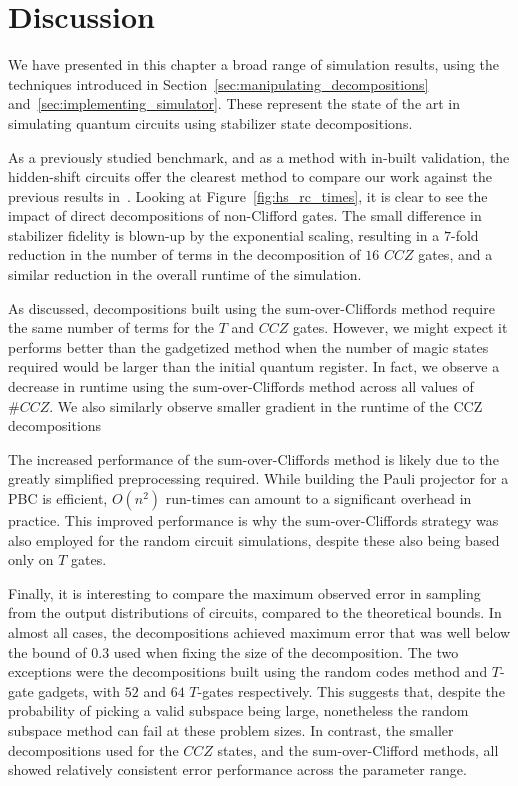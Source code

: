 \section{Discussion}
We have presented in this chapter a broad range of simulation results, using the techniques introduced in Section~\ref{sec:manipulating_decompositions} and~\ref{sec:implementing_simulator}. These represent the state of the art in simulating quantum circuits using stabilizer state decompositions.\par
As a previously studied benchmark, and as a method with in-built validation, the hidden-shift circuits offer the clearest method to compare our work against the previous results in~\cite{Bravyi2016}. Looking at Figure~\ref{fig:hs_rc_times}, it is clear to see the impact of direct decompositions of non-Clifford gates. The small difference in stabilizer fidelity is blown-up by the exponential scaling, resulting in a $7$-fold reduction in the number of terms in the decomposition of $16$ $CCZ$ gates, and a similar reduction in the overall runtime of the simulation.\par
As discussed, decompositions built using the sum-over-Cliffords method require the same number of terms for the $T$ and $CCZ$ gates. However, we might expect it performs better than the gadgetized method when the number of magic states required would be larger than the initial quantum register. In fact, we observe a decrease in runtime using the sum-over-Cliffords method across all values of $\# CCZ$. We also similarly observe smaller gradient in the runtime of the CCZ decompositions\par
The increased performance of the sum-over-Cliffords method is likely due to the greatly simplified preprocessing required. While building the Pauli projector for a PBC is efficient, $O(n^{2})$ run-times can amount to a significant overhead in practice. This improved performance is why the sum-over-Cliffords strategy was also employed for the random circuit simulations, despite these also being based only on $T$ gates.\par
Finally, it is interesting to compare the maximum observed error in sampling from the output distributions of circuits, compared to the theoretical bounds. In almost all cases, the decompositions achieved maximum error that was well below the bound of $0.3$ used when fixing the size of the decomposition. The two exceptions were the decompositions built using the random codes method and $T$-gate gadgets, with $52$ and $64$ $T$-gates respectively. This suggests that, despite the probability of picking a valid subspace being large, nonetheless the random subspace method can fail at these problem sizes. In contrast, the smaller decompositions used for the $CCZ$ states, and the sum-over-Clifford methods, all showed relatively consistent error performance across the parameter range.\par
